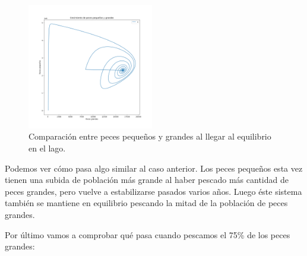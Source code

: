 \documentclass[11pt,a4paper]{report}
\begin{document}
\begin{figure}[H]
	\begin{center}
		\includegraphics[width=0.49\textwidth]{img/Cap-3/apartado-2/pequenyos_grandes_pesca_50.png}
		\caption{Comparación entre peces pequeños y grandes al llegar al equilibrio en el lago.}
		\label{fig:f3}
	\end{center}
\end{figure}

Podemos ver cómo pasa algo similar al caso anterior. Los peces pequeños esta vez tienen una subida de población más grande al haber pescado más cantidad de peces grandes, pero vuelve a estabilizarse pasados varios años. Luego éste sistema también se mantiene en equilibrio pescando la mitad de la población de peces grandes.

Por último vamos a comprobar qué pasa cuando pescamos el 75\% de los peces grandes:
\end{document}
